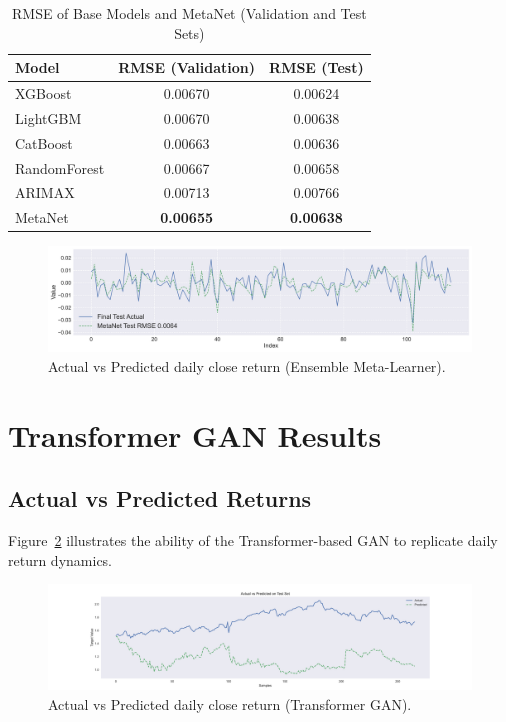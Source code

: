 \begin{table}[h!]
\centering
\caption{RMSE of Base Models and MetaNet (Validation and Test Sets)}
\label{tab:ensemble_base_models}
\begin{tabular}{lcc}
\toprule
\textbf{Model} & \textbf{RMSE (Validation)} & \textbf{RMSE (Test)} \\
\midrule
XGBoost     & 0.00670 & 0.00624 \\
LightGBM    & 0.00670 & 0.00638 \\
CatBoost    & 0.00663 & 0.00636 \\
RandomForest & 0.00667 & 0.00658 \\
ARIMAX      & 0.00713 & 0.00766 \\
MetaNet     & \textbf{0.00655} & \textbf{0.00638} \\
\bottomrule
\end{tabular}
\end{table}

\begin{figure}[h!]
    \centering
    \includegraphics[width=\textwidth]{Images/metanet_final_test_plot__1.pdf}
    \caption{Actual vs Predicted daily close return (Ensemble Meta-Learner).}
    \label{fig:ensemble_actual_vs_pred}
\end{figure}

\section{Transformer GAN Results}
\subsection{Actual vs Predicted Returns}
Figure~\ref{fig:tgan_actual_vs_pred} illustrates the ability of the Transformer-based GAN to replicate daily return dynamics.

\begin{figure}[h!]
    \centering
    \includegraphics[width=\textwidth]{Images/_8_ActualVsPred_c.pdf}
    \caption{Actual vs Predicted daily close return (Transformer GAN).}
    \label{fig:tgan_actual_vs_pred}
\end{figure}

